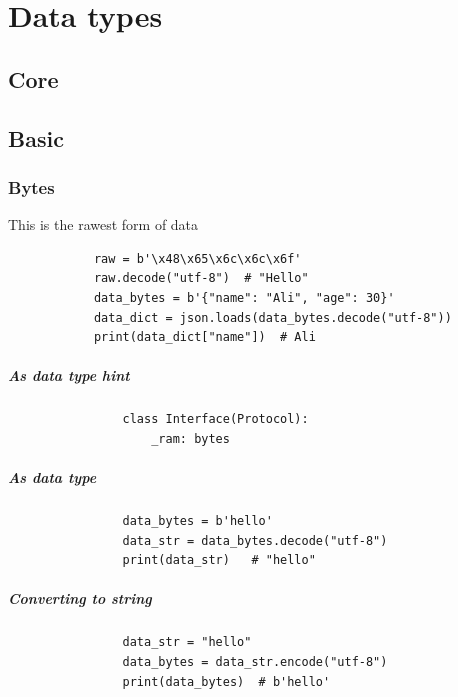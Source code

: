 \chapter{Data types}

\section{Core}

\section{Basic}
    
    \subsection{Bytes}
        This is the rawest form of data
        \begin{verbatim}
            raw = b'\x48\x65\x6c\x6c\x6f'
            raw.decode("utf-8")  # "Hello"
            data_bytes = b'{"name": "Ali", "age": 30}'
            data_dict = json.loads(data_bytes.decode("utf-8"))
            print(data_dict["name"])  # Ali
        \end{verbatim}
        
        \paragraph{As data type hint}
            \begin{verbatim}
                class Interface(Protocol):
                    _ram: bytes
            \end{verbatim}
        
        \paragraph{As data type}
            \begin{verbatim}
                data_bytes = b'hello'
                data_str = data_bytes.decode("utf-8")
                print(data_str)   # "hello"
            \end{verbatim}
        
        \paragraph{Converting to string}
            \begin{verbatim}
                data_str = "hello"
                data_bytes = data_str.encode("utf-8")
                print(data_bytes)  # b'hello'
            \end{verbatim}
    
